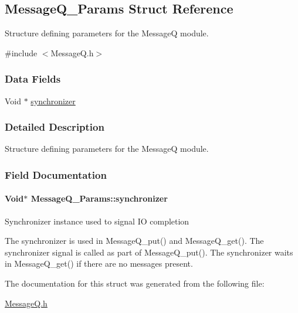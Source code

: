 \subsection{Message\-Q\-\_\-\-Params Struct Reference}
\label{struct_message_q___params}


Structure defining parameters for the Message\-Q module.  




{\ttfamily \#include $<$Message\-Q.\-h$>$}

\subsubsection*{Data Fields}
\begin{DoxyCompactItemize}
\item 
Void $\ast$ \hyperlink{struct_message_q___params_a6f428033e1aa39162fd51a6d8ade1c9d}{synchronizer}
\end{DoxyCompactItemize}


\subsubsection{Detailed Description}
Structure defining parameters for the Message\-Q module. 

\subsubsection{Field Documentation}
\paragraph[{synchronizer}]{\setlength{\rightskip}{0pt plus 5cm}Void$\ast$ Message\-Q\-\_\-\-Params\-::synchronizer}\label{struct_message_q___params_a6f428033e1aa39162fd51a6d8ade1c9d}
Synchronizer instance used to signal I\-O completion \begin{DoxyVerb}   The synchronizer is used in MessageQ_put() and MessageQ_get().
   The synchronizer signal is called as part of MessageQ_put().
   The synchronizer waits in MessageQ_get() if there are no messages
   present.\end{DoxyVerb}
 

The documentation for this struct was generated from the following file\-:\begin{DoxyCompactItemize}
\item 
\hyperlink{_message_q_8h}{Message\-Q.\-h}\end{DoxyCompactItemize}
